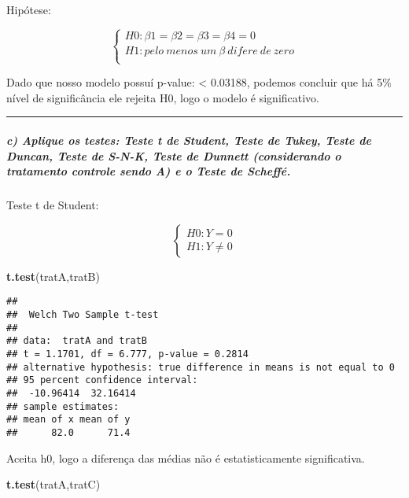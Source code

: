 \documentclass[
]{article}
\newenvironment{Shaded}{\begin{snugshade}}{\end{snugshade}}
\newcommand{\FunctionTok}[1]{\textcolor[rgb]{0.13,0.29,0.53}{\textbf{#1}}}
\newcommand{\NormalTok}[1]{#1}
\begin{document}
Hipótese:

\[
\left\{ \begin{array}{rc} 
H0: \beta1 = \beta2 = \beta3 = \beta4 = 0 \\ 
H1: pelo \ menos \ um \ \beta \ difere \ de \ zero \\ 
\end{array}\right.
\]

Dado que nosso modelo possuí p-value: \textless{} 0.03188, podemos
concluir que há 5\% nível de significância ele rejeita H0, logo o modelo
é significativo.

\begin{center}\rule{0.5\linewidth}{0.5pt}\end{center}

\hypertarget{c-aplique-os-testes-teste-t-de-student-teste-de-tukey-teste-de-duncan-teste-de-s-n-k-teste-de-dunnett-considerando-o-tratamento-controle-sendo-a-e-o-teste-de-scheffuxe9.}{%
\subparagraph{c) Aplique os testes: Teste t de Student, Teste de Tukey,
Teste de Duncan, Teste de S-N-K, Teste de Dunnett (considerando o
tratamento controle sendo A) e o Teste de
Scheffé.}\label{c-aplique-os-testes-teste-t-de-student-teste-de-tukey-teste-de-duncan-teste-de-s-n-k-teste-de-dunnett-considerando-o-tratamento-controle-sendo-a-e-o-teste-de-scheffuxe9.}}

Teste t de Student:

\[
\left\{ \begin{array}{rc} 
H0: Y = 0 \\ 
H1: Y \neq 0
\end{array}\right.
\]

\begin{Shaded}
\begin{Highlighting}[]
\FunctionTok{t.test}\NormalTok{(tratA,tratB)}
\end{Highlighting}
\end{Shaded}

\begin{verbatim}
## 
##  Welch Two Sample t-test
## 
## data:  tratA and tratB
## t = 1.1701, df = 6.777, p-value = 0.2814
## alternative hypothesis: true difference in means is not equal to 0
## 95 percent confidence interval:
##  -10.96414  32.16414
## sample estimates:
## mean of x mean of y 
##      82.0      71.4
\end{verbatim}

Aceita h0, logo a diferença das médias não é estatisticamente
significativa.

\begin{Shaded}
\begin{Highlighting}[]
\FunctionTok{t.test}\NormalTok{(tratA,tratC)}
\end{Highlighting}
\end{Shaded}
\end{document}
